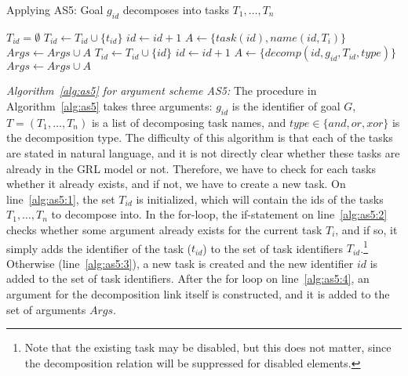 \begin{algorithm}[h]
  \caption{Applying AS5: Goal $g_{id}$ decomposes into tasks $T_1,\ldots,T_n$}\label{alg:as5}
  \begin{algorithmic}[1]
    \State $T_{id} = \emptyset$\label{alg:as5:1}
        \State $T_{id} \gets T_{id} \cup \{t_{id}\}$
      \Else\label{alg:as5:3}
        \State $id\gets id+1$
        \State $A \gets \{task(id),name(id,T_i)\}$
        \State $Args \gets Args\cup A$
        \State $T_{id} \gets T_{id} \cup \{id\}$
      \EndIf
    \EndFor
    \State $id\gets id+1$\label{alg:as5:4}
    \State $A\gets \{decomp(id, g_{id}, T_{id}, type)\}$
    \State $Args \gets Args\cup A$
    \EndProcedure
  \end{algorithmic}
\end{algorithm}

\emph{Algorithm~\ref{alg:as5} for argument scheme AS5:} The procedure in Algorithm~\ref{alg:as5} takes three arguments: $g_{id}$ is the identifier of goal $G$, $T=(T_1,\ldots,T_n)$ is a list of decomposing task names, and $type\in\{and,or,xor\}$ is the decomposition type. The difficulty of this algorithm is that each of the tasks are stated in natural language, and it is not directly clear whether these tasks are already in the GRL model or not. Therefore, we have to check for each tasks whether it already exists, and if not, we have to create a new task. On line~\ref{alg:as5:1}, the set $T_{id}$ is initialized, which will contain the ids of the tasks $T_1,\ldots,T_n$ to decompose into. In the for-loop, the if-statement on line~\ref{alg:as5:2} checks whether some argument already exists for the current task $T_i$, and if so, it simply adds the identifier of the task ($t_{id}$) to the set of task identifiers $T_{id}$.\footnote{Note that the existing task may be disabled, but this does not matter, since the decomposition relation will be suppressed for disabled elements.} Otherwise (line~\ref{alg:as5:3}), a new task is created and the new identifier $id$ is added to the set of task identifiers. After the for loop on line~\ref{alg:as5:4}, an argument for the decomposition link itself is constructed, and it is added to the set of arguments $Args$.

